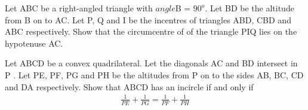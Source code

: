 \item Let ABC be a right-angled triangle with $angle$B = $90^{o}$. Let BD be the altitude from B on to AC. Let P, Q and I be the incentres of triangles ABD, CBD and ABC respectively. Show that the circumcentre of of the triangle PIQ lies on the hypotenuse AC.

\item Let ABCD be a convex quadrilateral. Let the diagonals AC and BD intersect in P . Let PE, PF, PG and PH be the altitudes from P on to the sides AB, BC, CD and DA respectively. Show that ABCD has an incircle if and only if
\begin{align*}
\frac{1}{PE} + \frac{1}{PG} = \frac{1}{PF} + \frac{1}{PH}
\end{align*}
























